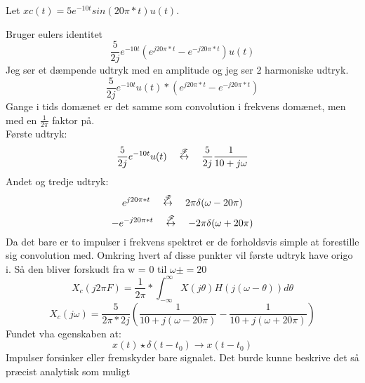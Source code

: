 
\begin{Opgaver}
    \begin{kapitel}
        \begin{Opgave}
            Let $xc(t) = 5e^{-10t}sin(20\pi*t)u(t)$.
            \begin{UnderOpgave}
                Bruger eulers identitet 
                \eulersIdentitetSin
                \[\frac{5}{2j}e^{-10t}(e^{j20\pi*t} - e^{-j20\pi*t})u(t)\]
                Jeg ser et dæmpende udtryk med en amplitude og jeg ser 2 harmoniske udtryk. 
                \[\frac{5}{2j}e^{-10t}u(t) * (e^{j20\pi*t} - e^{-j20\pi*t})\]
                Gange i tids domænet er det samme som convolution i frekvens domænet, men med en $\frac{1}{2\pi}$ faktor på. \\
                Første udtryk: 
                \[\frac{5}{2j}e^{-10t}u(t) \transformation{F} \frac{5}{2j} \frac{1}{10 + j\omega}\]
                Andet og tredje udtryk: 
                \[e^{j20\pi*t} \transformation{F} 2\pi\delta(\omega - 20\pi)\]
                \[-e^{-j20\pi*t} \transformation{F} -2\pi\delta(\omega + 20\pi)\]
                Da det bare er to impulser i frekvens spektret er de forholdsvis simple at forestille sig convolution med. 
                Omkring hvert af disse punkter vil første udtryk have origo i. Så den bliver forskudt fra w = 0 til $\omega \pm = 20$
                \[X_c(j2\pi F) = \frac{1}{2\pi} * \int_{-\infty}^{\infty}{X(j\theta)H(j(\omega - \theta)) d\theta}\]
                \[X_c(j\omega) = \frac{5}{2\pi * 2j} (\frac{1}{10 + j(\omega - 20\pi)} - \frac{1}{10 + j(\omega + 20\pi)})\]
                Fundet vha egenskaben at: 
                \[x(t)\star\delta(t - t_0) \rightarrow x(t - t_0)\]
                Impulser forsinker eller fremskyder bare signalet.
                Det burde kunne beskrive det så præcist analytisk som muligt
                \vspace{150pt}
            \end{UnderOpgave}
            \begin{UnderOpgave}
            \end{UnderOpgave}


\end{Opgave}
\end{kapitel}
\end{Opgaver}
